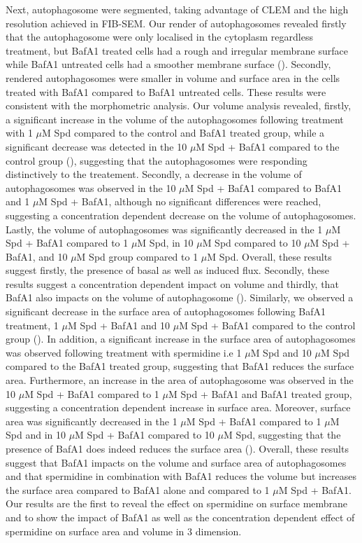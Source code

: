 Next, autophagosome were segmented, taking advantage of CLEM and the high resolution achieved in FIB-SEM. Our render of autophagosomes revealed firstly that the autophagosome were only localised in the cytoplasm regardless treatment, but BafA1 treated cells had a rough and irregular membrane surface while BafA1 untreated cells had a smoother membrane surface (). Secondly, rendered autophagosomes were smaller in volume and surface area in the cells treated with BafA1 compared to BafA1 untreated cells. These results were consistent with the morphometric analysis. Our volume analysis revealed, firstly, a significant increase in the volume of the autophagosomes following treatment with 1 $\mu$M Spd compared to the control and BafA1 treated group, while a significant decrease was detected in the 10 $\mu$M Spd + BafA1 compared to the control group (), suggesting that the autophagosomes were responding distinctively to the treatement.  Secondly, a decrease in the volume of autophagosomes was observed in the 10 $\mu$M Spd + BafA1 compared to BafA1 and 1 $\mu$M Spd + BafA1, although no significant differences were reached, suggesting a concentration  dependent decrease on the volume of autophagosomes. Lastly, the volume of autophagosomes was significantly decreased in the 1 $\mu$M Spd + BafA1 compared to 1 $\mu$M Spd, in 10 $\mu$M Spd  compared to 10 $\mu$M Spd + BafA1, and 10 $\mu$M Spd group compared to 1 $\mu$M Spd. Overall, these results suggest firstly, the presence of basal as well as induced flux. Secondly, these results suggest a concentration dependent impact on volume and thirdly, that BafA1 also impacts on the volume of autophagosome (). Similarly, we observed
 a significant decrease in the surface area of autophagosomes following  BafA1 treatment, 1 $\mu$M Spd + BafA1  and 10 $\mu$M Spd + BafA1 compared to the control group (). In addition, a significant increase in the surface area of autophagosomes was observed following treatment with spermidine i.e 1 $\mu$M Spd  and 10 $\mu$M Spd compared to the BafA1 treated group, suggesting that BafA1 reduces the surface area. Furthermore, an increase in the area of autophagosome was observed in the 10 $\mu$M Spd + BafA1 compared to 1 $\mu$M Spd + BafA1 and BafA1 treated group, suggesting a concentration dependent increase in surface area. Moreover, surface area was significantly decreased in the 1 $\mu$M Spd + BafA1 compared to 1 $\mu$M Spd and in 10 $\mu$M Spd + BafA1 compared to 10 $\mu$M Spd, suggesting that the presence of BafA1 does indeed reduces the surface area (). Overall, these results suggest that BafA1 impacts on the volume and surface area of autophagosomes and that spermidine in combination with BafA1 reduces the volume but increases the surface area compared to BafA1 alone and compared to 1 $\mu$M Spd + BafA1. Our results are the first to reveal the effect on spermidine on surface membrane and to show the impact of BafA1 as well as the concentration dependent effect of spermidine on surface area and volume in 3 dimension.






